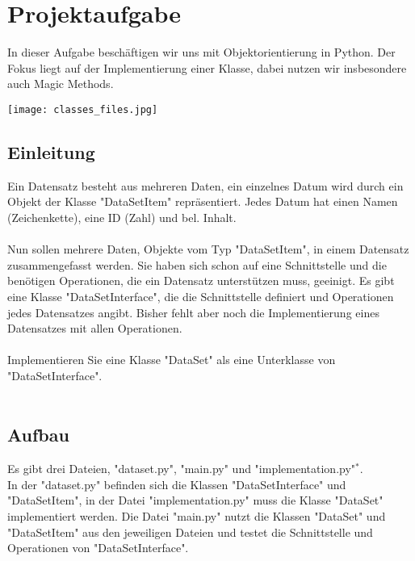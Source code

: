 \documentclass[]{article}
\begin{document}
\section{Projektaufgabe}
In dieser Aufgabe beschäftigen wir uns mit Objektorientierung in Python.
Der Fokus liegt auf der Implementierung einer Klasse, dabei nutzen wir insbesondere auch Magic Methods.
\begin{center}
\hfill\break
\texttt{[image: classes\_files.jpg]}
\hfill\break
{}
\end{center}
\subsection{Einleitung}
Ein Datensatz besteht aus mehreren Daten, ein einzelnes Datum wird durch ein Objekt der Klasse "DataSetItem" repräsentiert.
Jedes Datum hat einen Namen (Zeichenkette), eine ID (Zahl) und bel. Inhalt.\\
\\
Nun sollen mehrere Daten, Objekte vom Typ "DataSetItem", in einem Datensatz zusammengefasst werden.
Sie haben sich schon auf eine Schnittstelle und die benötigen Operationen, die ein Datensatz unterstützen muss, geeinigt.
Es gibt eine Klasse "DataSetInterface", die die Schnittstelle definiert und Operationen jedes Datensatzes angibt.
Bisher fehlt aber noch die Implementierung eines Datensatzes mit allen Operationen.\\
\\
Implementieren Sie eine Klasse "DataSet" als eine Unterklasse von "DataSetInterface".\\
\\
\subsection{Aufbau}
Es gibt drei Dateien, "dataset.py", "main.py" und "implementation.py"$^*$.\\
In der "dataset.py" befinden sich die Klassen "DataSetInterface" und "DataSetItem",
in der Datei "implementation.py" muss die Klasse "DataSet" implementiert werden.
Die Datei "main.py" nutzt die Klassen "DataSet" und "DataSetItem" aus den jeweiligen Dateien und testet die Schnittstelle und Operationen von "DataSetInterface".\\
\end{document}
